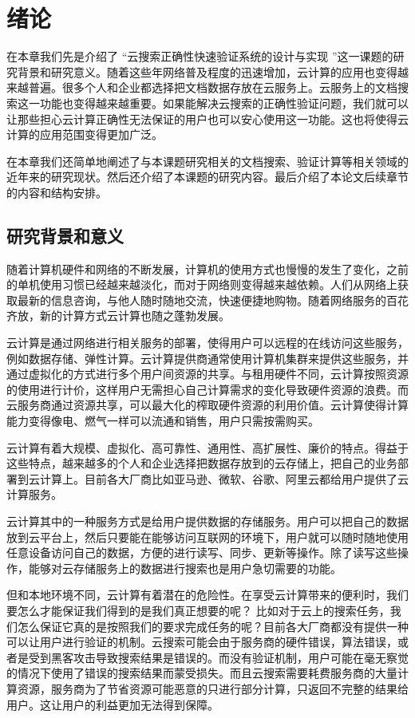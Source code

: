 \chapter{绪论}
\label{chap:introduction}

在本章我们先是介绍了
“云搜索正确性快速验证系统的设计与实现
”这一课题的研究背景和研究意义。随着这些年网络普及程度的迅速增加，云计算的应用也变得越来越普遍。很多个人和企业都选择把文档数据存放在云服务上。云服务上的文档搜索这一功能也变得越来越重要。如果能解决云搜索的正确性验证问题，我们就可以让那些担心云计算正确性无法保证的用户也可以安心使用这一功能。这也将使得云计算的应用范围变得更加广泛。

在本章我们还简单地阐述了与本课题研究相关的文档搜索、验证计算等相关领域的近年来的研究现状。然后还介绍了本课题的研究内容。最后介绍了本论文后续章节的内容和结构安排。

\section{研究背景和意义}
随着计算机硬件和网络的不断发展，计算机的使用方式也慢慢的发生了变化，之前的单机使用习惯已经越来越淡化，而对于网络则变得越来越依赖。人们从网络上获取最新的信息咨询，与他人随时随地交流，快速便捷地购物。随着网络服务的百花齐放，新的计算方式云计算也随之蓬勃发展。

云计算是通过网络进行相关服务的部署，使得用户可以远程的在线访问这些服务，例如数据存储、弹性计算。云计算提供商通常使用计算机集群来提供这些服务，并通过虚拟化的方式进行多个用户间资源的共享。与租用硬件不同，云计算按照资源的使用进行计价，这样用户无需担心自己计算需求的变化导致硬件资源的浪费。而云服务商通过资源共享，可以最大化的榨取硬件资源的利用价值。云计算使得计算能力变得像电、燃气一样可以流通和销售，用户只需按需购买。

云计算有着大规模、虚拟化、高可靠性、通用性、高扩展性、廉价的特点。得益于这些特点，越来越多的个人和企业选择把数据存放到的云存储上，把自己的业务部署到云计算上。目前各大厂商比如亚马逊、微软、谷歌、阿里云都给用户提供了云计算服务。

云计算其中的一种服务方式是给用户提供数据的存储服务。用户可以把自己的数据放到云平台上，然后只要能在能够访问互联网的环境下，用户就可以随时随地使用任意设备访问自己的数据，方便的进行读写、同步、更新等操作。除了读写这些操作，能够对云存储服务上的数据进行搜索也是用户急切需要的功能。

但和本地环境不同，云计算有着潜在的危险性。在享受云计算带来的便利时，我们要怎么才能保证我们得到的是我们真正想要的呢？
比如对于云上的搜索任务，我们怎么保证它真的是按照我们的要求完成任务的呢？目前各大厂商都没有提供一种可以让用户进行验证的机制。云搜索可能会由于服务商的硬件错误，算法错误，或者是受到黑客攻击导致搜索结果是错误的。而没有验证机制，用户可能在毫无察觉的情况下使用了错误的搜索结果而蒙受损失。而且云搜索需要耗费服务商的大量计算资源，服务商为了节省资源可能恶意的只进行部分计算，只返回不完整的结果给用户。这让用户的利益更加无法得到保障。

